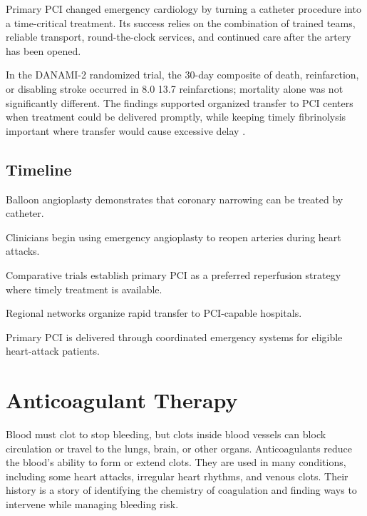 \documentclass[12pt,oneside]{book}
\begin{document}
Primary PCI changed emergency cardiology by turning a catheter procedure
into a time-critical treatment. Its success relies on the combination of
trained teams, reliable transport, round-the-clock services, and continued
care after the artery has been opened.

In the DANAMI-2 randomized trial, the 30-day composite of death, reinfarction,
or disabling stroke occurred in 8.0%
13.7%
reinfarctions; mortality alone was not significantly different. The findings
supported organized transfer to PCI centers when treatment could be delivered
promptly, while keeping timely fibrinolysis important where transfer would
cause excessive delay \cite{primaryPCITrial,ahaAcuteCoronaryGuideline}.

\section*{Timeline}
\begin{description}[leftmargin=2.3cm,style=nextline]
  \item[Late 1970s] Balloon angioplasty demonstrates that coronary narrowing can be treated by catheter.
  \item[1980s] Clinicians begin using emergency angioplasty to reopen arteries during heart attacks.
  \item[1990s] Comparative trials establish primary PCI as a preferred reperfusion strategy where timely treatment is available.
  \item[2000s onward] Regional networks organize rapid transfer to PCI-capable hospitals.
  \item[Today] Primary PCI is delivered through coordinated emergency systems for eligible heart-attack patients.
\end{description}
\chapter[Anticoagulant Therapy]{Anticoagulant Therapy}

Blood must clot to stop bleeding, but clots inside blood vessels can block
circulation or travel to the lungs, brain, or other organs. Anticoagulants
reduce the blood's ability to form or extend clots. They are used in many
conditions, including some heart attacks, irregular heart rhythms, and
venous clots. Their history is a story of identifying the chemistry of
coagulation and finding ways to intervene while managing bleeding risk.
\end{document}
